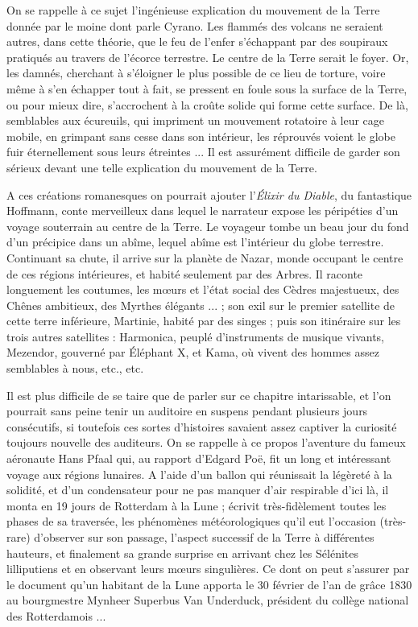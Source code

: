 \documentclass[a4paper, 11pt, oneside]{article}
\begin{document}
On se rappelle à ce sujet l'ingénieuse explication du mouvement de la Terre donnée par le moine dont parle Cyrano. Les flammés des volcans ne seraient autres, dans cette théorie, que le feu de l'enfer s'échappant par des soupiraux pratiqués au travers de l'écorce terrestre. Le centre de la Terre serait le foyer. Or, les damnés, cherchant à s'éloigner le plus possible de ce lieu de torture, voire même à s'en échapper tout à fait, se pressent en foule sous la surface de la Terre, ou pour mieux dire, s'accrochent à la croûte solide qui forme cette surface. De là, semblables aux écureuils, qui impriment un mouvement rotatoire à leur cage mobile, en grimpant sans cesse dans son intérieur, les réprouvés voient le globe fuir éternellement sous leurs étreintes ... Il est assurément difficile de garder son sérieux devant une telle explication du mouvement de la Terre.

A ces créations romanesques on pourrait ajouter l'\emph{Élixir du Diable}, du fantastique Hoffmann, conte merveilleux dans lequel le narrateur expose les péripéties d'un voyage souterrain au centre de la Terre. Le voyageur tombe un beau jour du fond d'un précipice dans un abîme, lequel abîme est l'intérieur du globe terrestre. Continuant sa chute, il arrive sur la planète de Nazar, monde occupant le centre de ces régions intérieures, et habité seulement par des Arbres. Il raconte longuement les coutumes, les mœurs et l'état social des Cèdres majestueux, des Chênes ambitieux, des Myrthes élégants ... ; son exil sur le premier satellite de cette terre inférieure, Martinie, habité par des singes ; puis son itinéraire sur les trois autres satellites : Harmonica, peuplé d'instruments de musique vivants, Mezendor, gouverné par Éléphant X, et Kama, où vivent des hommes assez semblables à nous, etc., etc.

Il est plus difficile de se taire que de parler sur ce chapitre intarissable, et l'on pourrait sans peine tenir un auditoire en suspens pendant plusieurs jours consécutifs, si toutefois ces sortes d'histoires savaient assez captiver la curiosité toujours nouvelle des auditeurs. On se rappelle à ce propos l'aventure du fameux aéronaute Hans Pfaal qui, au rapport d'Edgard Poë, fit un long et intéressant voyage aux régions lunaires. A l'aide d'un ballon qui réunissait la légèreté à la solidité, et d'un condensateur pour ne pas manquer d'air respirable d'ici là, il monta en 19 jours de Rotterdam à la Lune ; écrivit très-fidèlement toutes les phases de sa traversée, les phénomènes météorologiques qu'il eut l'occasion (très-rare) d'observer sur son passage, l'aspect successif de la Terre à différentes hauteurs, et finalement sa grande surprise en arrivant chez les Sélénites lilliputiens et en observant leurs mœurs singulières. Ce dont on peut s'assurer par le document qu'un habitant de la Lune apporta le 30 février de l'an de grâce 1830 au bourgmestre Mynheer Superbus Van Underduck, président du collège national des Rotterdamois ...
\end{document}
